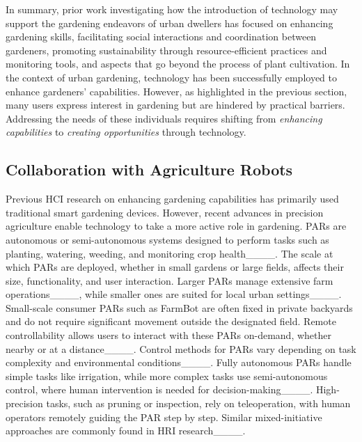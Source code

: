 In summary, prior work investigating how the introduction of technology may support the gardening endeavors of urban dwellers has focused on enhancing gardening skills, facilitating social interactions and coordination between gardeners, promoting sustainability through resource-efficient practices and monitoring tools, and aspects that go beyond the process of plant cultivation. In the context of urban gardening, technology has been successfully employed to enhance gardeners' capabilities. However, as highlighted in the previous section, many users express interest in gardening but are hindered by practical barriers. Addressing the needs of these individuals requires shifting from \textit{enhancing capabilities} to \textit{creating opportunities} through technology. 

\subsection{Collaboration with Agriculture Robots}\label{subsec:rel-robots}
Previous HCI research on enhancing gardening capabilities has primarily used traditional smart gardening devices. However, recent advances in precision agriculture enable technology to take a more active role in gardening. PARs are autonomous or semi-autonomous systems designed to perform tasks such as planting, watering, weeding, and monitoring crop health____. The scale at which PARs are deployed, whether in small gardens or large fields, affects their size, functionality, and user interaction. Larger PARs manage extensive farm operations____, while smaller ones are suited for local urban settings____. Small-scale consumer PARs such as FarmBot are often fixed in private backyards and do not require significant movement outside the designated field. Remote controllability allows users to interact with these PARs on-demand, whether nearby or at a distance____. Control methods for PARs vary depending on task complexity and environmental conditions____. Fully autonomous PARs handle simple tasks like irrigation, while more complex tasks use semi-autonomous control, where human intervention is needed for decision-making____. High-precision tasks, such as pruning or inspection, rely on teleoperation, with human operators remotely guiding the PAR step by step. Similar mixed-initiative approaches are commonly found in HRI research____.
